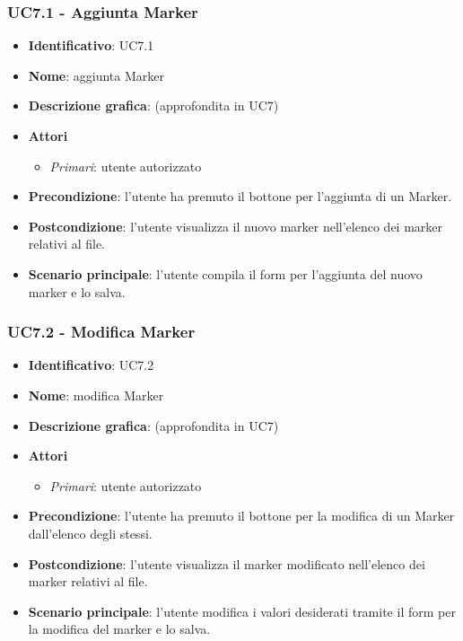 \subsubsection{UC7.1 - Aggiunta Marker}
\begin{itemize}
  \item \textbf{Identificativo}: UC7.1
  \item \textbf{Nome}: aggiunta Marker
  \item \textbf{Descrizione grafica}: (approfondita in UC7)
  \item \textbf{Attori}
        \begin{itemize}
          \item \textit{Primari}: utente autorizzato
        \end{itemize}
  \item \textbf{Precondizione}: l'utente ha premuto il bottone per l'aggiunta di un Marker.
  \item \textbf{Postcondizione}: l'utente visualizza il nuovo marker nell'elenco dei marker relativi al file.
  \item \textbf{Scenario principale}: l'utente compila il form per l'aggiunta del nuovo marker e lo salva.
\end{itemize}

\subsubsection{UC7.2 - Modifica Marker}
\begin{itemize}
  \item \textbf{Identificativo}: UC7.2
  \item \textbf{Nome}: modifica Marker
  \item \textbf{Descrizione grafica}: (approfondita in UC7)
  \item \textbf{Attori}
        \begin{itemize}
          \item \textit{Primari}: utente autorizzato
        \end{itemize}
  \item \textbf{Precondizione}: l'utente ha premuto il bottone per la modifica di un Marker dall'elenco degli stessi.
  \item \textbf{Postcondizione}: l'utente visualizza il marker modificato nell'elenco dei marker relativi al file.
  \item \textbf{Scenario principale}: l'utente modifica i valori desiderati tramite il form per la modifica del marker e lo salva.
\end{itemize}

